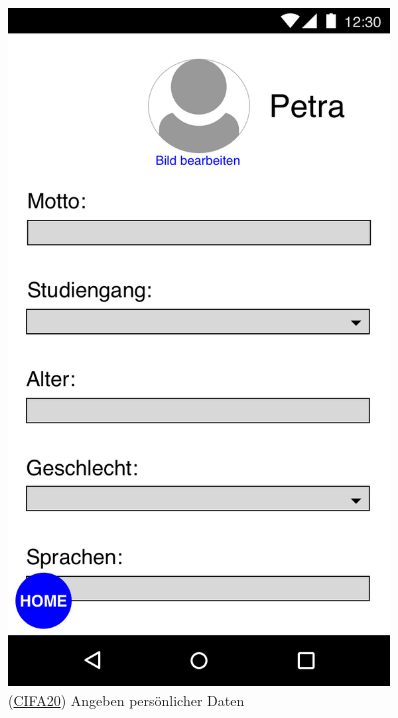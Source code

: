 \documentclass[a4paper]{scrreprt}
\begin{document}
\begin{figure}[H]
	\centering 
	\begin{minipage}[b]{0.48\textwidth} 
		\centering 
		\includegraphics[width=0.9\textwidth]{res/GUI/03.jpeg} 
		\label{Fig.3}
		(\hyperlink{cifa20}{CIFA20}) Angeben persönlicher Daten
	\end{minipage}
	\begin{minipage}[b]{0.48\textwidth} 
		\centering 

\end{minipage}
\end{figure}
\end{document}
